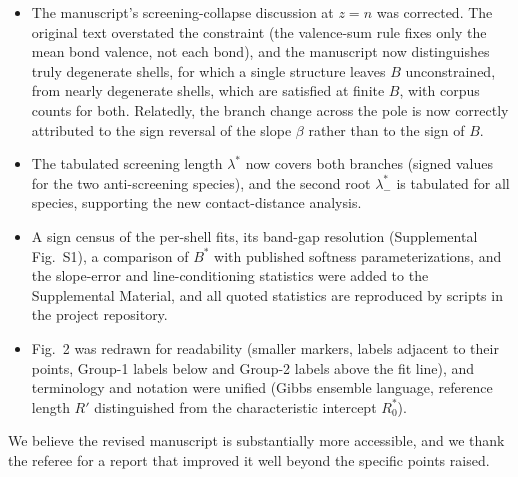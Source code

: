 \documentclass[11pt]{article}
\begin{document}
\begin{itemize}
\item The manuscript's screening-collapse discussion at $z=n$ was
corrected.  The original text overstated the constraint (the
valence-sum rule fixes only the mean bond valence, not each bond),
and the manuscript now distinguishes truly degenerate shells, for
which a single structure leaves $B$ unconstrained, from nearly
degenerate shells, which are satisfied at finite $B$, with corpus
counts for both.  Relatedly, the branch change across the pole is now
correctly attributed to the sign reversal of the slope $\beta$ rather
than to the sign of $B$.
\item The tabulated screening length $\lambda^*$ now covers both
branches (signed values for the two anti-screening species), and the
second root $\lambda^*_-$ is tabulated for all species, supporting the
new contact-distance analysis.
\item A sign census of the per-shell fits, its band-gap resolution
(Supplemental Fig.~S1), a comparison of $B^*$ with published softness
parameterizations, and the slope-error and line-conditioning
statistics were added to the Supplemental Material, and all quoted
statistics are reproduced by scripts in the project repository.
\item Fig.~2 was redrawn for readability (smaller markers, labels
adjacent to their points, Group-1 labels below and Group-2 labels
above the fit line), and terminology and notation were unified (Gibbs
ensemble language, reference length $R'$ distinguished from the
characteristic intercept $R_0^*$).
\end{itemize}

We believe the revised manuscript is substantially more accessible, and
we thank the referee for a report that improved it well beyond the
specific points raised.
\end{document}
